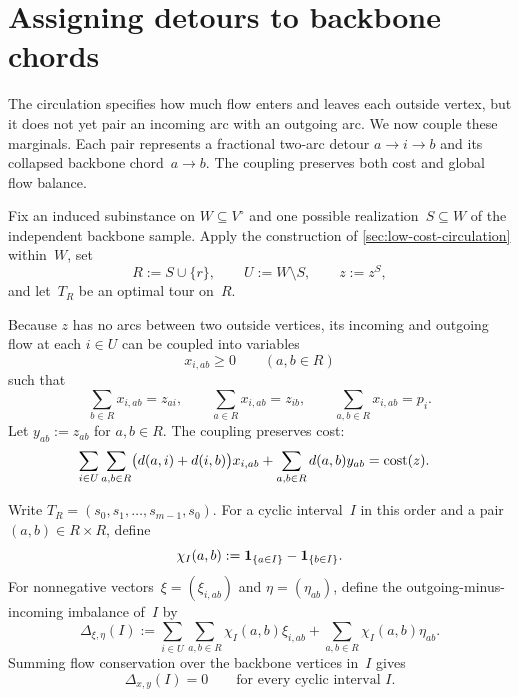 \documentclass[12pt,a4paper,oneside]{report}
\begin{document}
\fi

\section{Assigning detours to backbone chords}
\label{sec:detour-chord-assignment}

The circulation specifies how much flow enters and leaves each outside
vertex, but it does not yet pair an incoming arc with an outgoing arc.  We now
couple these marginals.  Each pair represents a fractional two-arc detour
$a\to i\to b$ and its collapsed backbone chord~$a\to b$.  The coupling
preserves both cost and global flow balance.

Fix an induced subinstance on $W\subseteq V^\circ$ and one possible
realization~$S\subseteq W$ of the independent backbone sample.  Apply the
construction of \cref{sec:low-cost-circulation} within~$W$, set
\[
    R:=S\cup\{r\},
    \qquad U:=W\setminus S,
    \qquad z:=z^S,
\]
and let~$T_R$ be an optimal tour on~$R$.

Because $z$ has no arcs between two outside vertices, its incoming and
outgoing flow at each $i\in U$ can be coupled into variables
\[
    x_{i,ab}\ge0
    \qquad(a,b\in R)
\]
such that
\begin{equation}\label{eq:rounding-coupling}
    \sum_{b\in R}x_{i,ab}=z_{ai},
    \qquad
    \sum_{a\in R}x_{i,ab}=z_{ib},
    \qquad
    \sum_{a,b\in R}x_{i,ab}=p_i.
\end{equation}
Let $y_{ab}:=z_{ab}$ for $a,b\in R$.  The coupling preserves cost:
\begin{align}
    &\sum_{i\in U}\sum_{a,b\in R}
       \bigl(d(a,i)+d(i,b)\bigr)x_{i,ab}
      +\sum_{a,b\in R}d(a,b)y_{ab}
      =\operatorname{cost}(z).
    \label{eq:rounding-coupling-cost}
\end{align}

Write $T_R=(s_0,s_1,\ldots,s_{m-1},s_0)$.  For a cyclic interval~$I$ in
this order and a pair $(a,b)\in R\times R$, define
\[
    \chi_I(a,b):=\mathbf{1}_{\{a\in I\}}-\mathbf{1}_{\{b\in I\}}.
\]
For nonnegative vectors~$\xi=(\xi_{i,ab})$ and
$\eta=(\eta_{ab})$, define the outgoing-minus-incoming imbalance of~$I$ by
\[
    \Delta_{\xi,\eta}(I)
    :=
    \sum_{i\in U}\sum_{a,b\in R}\chi_I(a,b)\xi_{i,ab}
    +\sum_{a,b\in R}\chi_I(a,b)\eta_{ab}.
\]
Summing flow conservation over the backbone vertices in~$I$ gives
\begin{equation}\label{eq:rounding-fractional-interval-balance}
    \Delta_{x,y}(I)=0
    \qquad\text{for every cyclic interval }I.
\end{equation}
\end{document}
